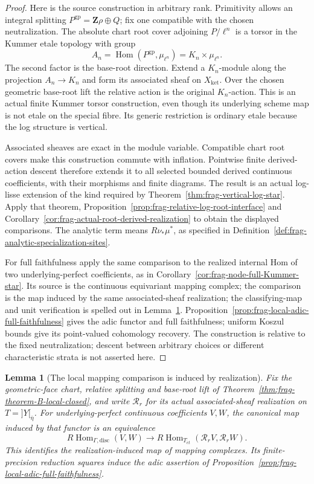 \documentclass[11pt]{article}
\newtheorem{lemma}[theorem]{Lemma}
\theoremstyle{definition}
\theoremstyle{remark}
\begin{document}
\begin{proof}
Here is the source construction in arbitrary rank.  Primitivity allows
an integral splitting $P^{\mathrm{gp}}=\mathbf Z\rho\oplus Q$; fix one
compatible with the chosen neutralization.  The absolute chart root
cover adjoining $P/\ell^n$ is a torsor in the Kummer etale topology
with group
\[
 A_n=\operatorname{Hom}(P^{\mathrm{gp}},\mu_{\ell^n})
       =K_n\times\mu_{\ell^n}.
\]
The second factor is the base-root direction.  Extend a $K_n$-module
along the projection $A_n\to K_n$ and form its associated sheaf on
$X_{\mathrm{ket}}$.  Over the chosen geometric base-root lift the
relative action is the original $K_n$-action.  This is an actual
finite Kummer torsor construction, even though its underlying scheme
map is not etale on the special fibre.  Its generic restriction is
ordinary etale because the log structure is vertical.

Associated sheaves are exact in the module variable.  Compatible
chart root covers make this construction commute with inflation.
Pointwise finite derived-action descent therefore extends it to all
selected bounded derived continuous coefficients, with their morphisms
and finite diagrams.  The result is an actual log-lisse extension of
the kind required by Theorem~\ref{thm:frag-vertical-log-star}.
Apply that theorem, Proposition~\ref{prop:frag-relative-log-root-interface} and Corollary~\ref{cor:frag-actual-root-derived-realization} to obtain the displayed comparisons.
The analytic term means $R\nu_*\mu^*$, as specified in
Definition~\ref{def:frag-analytic-specialization-sites}.

For full faithfulness apply the same comparison to the realized
internal Hom of two underlying-perfect coefficients, as in
Corollary~\ref{cor:frag-node-full-Kummer-star}.  Its source is the
continuous equivariant mapping complex; the comparison is the map
induced by the same associated-sheaf realization; the classifying-map
and unit verification is spelled out in
Lemma~\ref{lem:frag-B-local-mapping-unit}.
Proposition~\ref{prop:frag-local-adic-full-faithfulness} gives the
adic functor and full faithfulness; uniform Koszul bounds give its
point-valued cohomology recovery.  The construction
is relative to the fixed neutralization; descent between arbitrary
choices or different characteristic strata is not asserted here.
\end{proof}


\begin{lemma}[The local mapping comparison is induced by realization]
\label{lem:frag-B-local-mapping-unit}
Fix the geometric-face chart, relative splitting and base-root lift
of Theorem~\ref{thm:frag-theorem-B-local-closed}, and write $\mathcal R_r$ for its actual
associated-sheaf realization on $T=]Y[_{\bar\eta}$.
For underlying-perfect continuous coefficients $V,W$, the canonical
map induced by that functor is an equivalence
\[
 R\operatorname{Hom}_{\Gamma,\mathrm{disc}}(V,W)
 \longrightarrow
 R\operatorname{Hom}_{T_{\acute et}}(\mathcal R_rV,\mathcal R_rW).
\]
This identifies the realization-induced map of mapping complexes.  Its finite-precision reduction squares induce the adic assertion
of Proposition~\ref{prop:frag-local-adic-full-faithfulness}.
\end{lemma}
\end{document}
